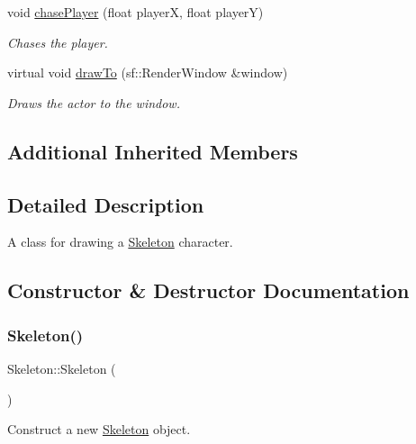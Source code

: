 \begin{DoxyCompactItemize}
void \mbox{\hyperlink{classSkeleton_aefa4683beb507bafaa2b20eaba4f478d}{chase\+Player}} (float playerX, float playerY)
\begin{DoxyCompactList}\small\item\em Chases the player. \end{DoxyCompactList}\item 
virtual void \mbox{\hyperlink{classSkeleton_aa39ac09590a5274536dc2fc125cc62e6}{draw\+To}} (sf\+::\+Render\+Window \&window)
\begin{DoxyCompactList}\small\item\em Draws the actor to the window. \end{DoxyCompactList}\end{DoxyCompactItemize}
\subsection*{Additional Inherited Members}


\subsection{Detailed Description}
A class for drawing a \mbox{\hyperlink{classSkeleton}{Skeleton}} character. 



\subsection{Constructor \& Destructor Documentation}
\mbox{\label{classSkeleton_af01a02f1ce9ae4c801cd6e66ccf7407f}} 
\subsubsection{\texorpdfstring{Skeleton()}{Skeleton()}}
{\footnotesize\ttfamily Skeleton\+::\+Skeleton (\begin{DoxyParamCaption}{ }\end{DoxyParamCaption})}



Construct a new \mbox{\hyperlink{classSkeleton}{Skeleton}} object. 

\mbox{\label{classSkeleton_ae6a32fa46fd502bc2f6c2cfafff24003}} 
